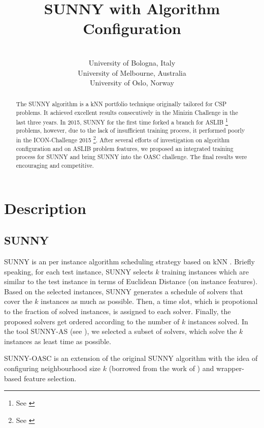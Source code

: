 \documentclass[tablecaption=bottom,wcp]{jmlr} %
\title[SUNNY-OASC]{SUNNY with Algorithm Configuration}
\author{\Name{Tong Liu} \Email{t.liu@unibo.it}\\
 \addr University of Bologna, Italy 
 \AND
 \Name{Roberto Amadini} \Email{roberto.amadini@unimelb.edu.au}\\
 \addr University of Melbourne, Australia
 \AND
 \Name{Jacopo Mauro} \Email{mauro.jacopo@gmail.com}\\
 \addr University of Oslo, Norway
 }
\newcommand{\TODO}[1]{\textcolor{red}{#1}}
\begin{document}
\maketitle

\begin{abstract}%
The SUNNY algorithm is a kNN portfolio technique originally tailored for CSP problems.
It achieved excellent results consecutively in the Minizin Challenge in the last three years. 
In 2015, SUNNY for the first time forked a branch for ASLIB \footnote{See \cite{bischl2016aslib}} problems, however, due to
the lack of insufficient training process, it performed poorly in the ICON-Challenge 2015 \footnote{See \cite{kotthoff2015icon}}.
After several efforts of investigation on algorithm configuration and on ASLIB problem features, we proposed
an integrated training process for SUNNY and bring SUNNY into the OASC challenge. The final results were
encouraging and competitive.

\end{abstract}


\section{Description}

\subsection{SUNNY}

SUNNY is an per instance algorithm scheduling strategy based on kNN 
. Briefly speaking, for each test instance, SUNNY selects
$k$ training instances which are similar to the test instance
in terms of Euclidean Distance (on instance features). Based on the selected instances,
SUNNY generates a schedule of solvers that cover the $k$ instances as much as possible. 
Then, a time slot, which is propotional to the fraction of solved instances, is
assigned to each solver. Finally, the proposed solvers get ordered
according to the number of $k$ instances solved. 
In the tool SUNNY-AS (see \cite{ictai_paper,sunnyas}),
we selected a subset of solvers, which solve 
the $k$ instances as least time as possible.
  

SUNNY-OASC is an extension of the
original SUNNY algorithm with the idea of configuring neighbourhood size $k$ 
(borrowed from the work of  \cite{DBLP:conf/lion/LindauerBH16}) and
wrapper-based feature selection.
\end{document}
